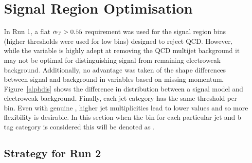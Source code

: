 
\chapter{Signal Region Optimisation} %

\label{Chapter3} %



In Run 1, a flat $\alpha_{\text{T}} > 0.55$ requirement was used for 
the signal region bins (higher thresholds were used for  
low \scalht bins) designed to reject QCD. However, while 
the \alphat variable is highly adept at removing the
QCD multijet background it may not be optimal for 
distinguishing signal from remaining electroweak 
background. 
Additionally, no advantage was taken of the shape 
differences between signal and background in variables 
based on missing momentum. Figure~\ref{alphdis} shows 
the difference in \alphat distribution between a signal 
model and electroweak background. 
Finally, each jet category has the same \alphat 
threshold per \scalht bin. Even with genuine \met, 
higher jet multiplicities lead to lower \alphat values 
and so more flexibility is 
desirable. In this section when the \scalht bin for each 
particular jet and b-tag category is considered this will 
be denoted as \scalhtcat.


\section{Strategy for Run 2}

